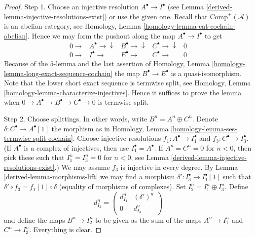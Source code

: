 \begin{proof}

Step 1. Choose an injective resolution $A^\bullet \to I^\bullet$ (see
Lemma \ref{derived-lemma-injective-resolutions-exist}) or use the given one.
Recall that $\text{Comp}^{+}(\mathcal{A})$ is an
abelian category, see
Homology, Lemma \ref{homology-lemma-cat-cochain-abelian}.
Hence we may form the pushout along
the map $A^\bullet \to I^\bullet$ to get
$$
\begin{array}{ccccc}0 \longrightarrow & A^\bullet \longrightarrow\downarrow & B^\bullet \longrightarrow\downarrow & C^\bullet \longrightarrow\downarrow & 0 \\ 0 \longrightarrow & I^\bullet \longrightarrow & E^\bullet \longrightarrow & C^\bullet \longrightarrow & 0\end{array}
$$
Because of the $5$-lemma and the last assertion of
Homology, Lemma \ref{homology-lemma-long-exact-sequence-cochain}
the map $B^\bullet \to E^\bullet$ is a quasi-isomorphism.
Note that the lower short exact sequence is termwise split, see
Homology, Lemma \ref{homology-lemma-characterize-injectives}.
Hence it suffices to prove the lemma when
$0 \to A^\bullet \to B^\bullet \to C^\bullet \to 0$ is
termwise split.

\medskip\noindent
Step 2. Choose splittings. In other words, write
$B^n = A^n \oplus C^n$. Denote $\delta : C^\bullet \to A^\bullet[1]$
the morphism as in
Homology, Lemma \ref{homology-lemma-ses-termwise-split-cochain}.
Choose injective resolutions $f_1 : A^\bullet \to I_1^\bullet$
and $f_3 : C^\bullet \to I_3^\bullet$. (If $A^\bullet$ is a complex of
injectives, then use $I_1^\bullet = A^\bullet$. If $A^n = C^n = 0$ for
$n < 0$, then pick these such that $I_1^n = I_3^n = 0$ for $n < 0$, see
Lemma \ref{derived-lemma-injective-resolutions-exist}.)
We may assume $f_3$ is injective in
every degree. By Lemma \ref{derived-lemma-morphisms-lift} we may find
a morphism $\delta' : I_3^\bullet \to I_1^\bullet[1]$ such
that $\delta' \circ f_3 = f_1[1] \circ \delta$ (equality of
morphisms of complexes). Set $I_2^n = I_1^n \oplus I_3^n$.
Define
$$
d_{I_2}^n =
\left(
\begin{matrix}
d_{I_1}^n & (\delta')^n \\
0 & d_{I_3}^n
\end{matrix}
\right)
$$
and define the maps $B^n \to I_2^n$ to be given as the
sum of the maps $A^n \to I_1^n$ and $C^n \to I_3^n$.
Everything is clear.
\end{proof}

